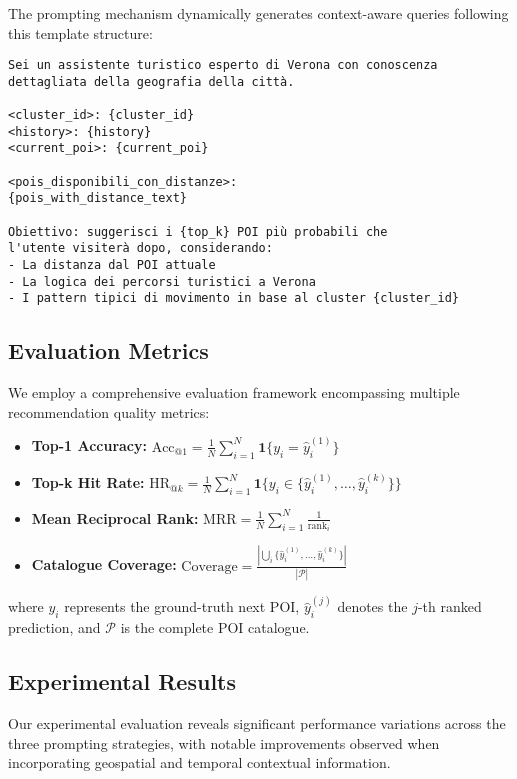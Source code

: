 \documentclass[12pt,a4paper]{article}
\begin{document}
The prompting mechanism dynamically generates context-aware queries following this template structure:

\begin{lstlisting}[language=text, caption=Comprehensive Context Prompt Template]
Sei un assistente turistico esperto di Verona con conoscenza 
dettagliata della geografia della città.

<cluster_id>: {cluster_id}
<history>: {history}
<current_poi>: {current_poi}

<pois_disponibili_con_distanze>:
{pois_with_distance_text}

Obiettivo: suggerisci i {top_k} POI più probabili che 
l'utente visiterà dopo, considerando:
- La distanza dal POI attuale
- La logica dei percorsi turistici a Verona
- I pattern tipici di movimento in base al cluster {cluster_id}
\end{lstlisting}

\subsection{Evaluation Metrics}

We employ a comprehensive evaluation framework encompassing multiple recommendation quality metrics:

\begin{itemize}
\item \textbf{Top-1 Accuracy:} $\text{Acc}_{@1} = \frac{1}{N}\sum_{i=1}^{N}\mathbf{1}\{y_i = \hat{y}_i^{(1)}\}$
\item \textbf{Top-k Hit Rate:} $\text{HR}_{@k} = \frac{1}{N}\sum_{i=1}^{N}\mathbf{1}\{y_i \in \{\hat{y}_i^{(1)}, \ldots, \hat{y}_i^{(k)}\}\}$
\item \textbf{Mean Reciprocal Rank:} $\text{MRR} = \frac{1}{N}\sum_{i=1}^{N}\frac{1}{\text{rank}_i}$
\item \textbf{Catalogue Coverage:} $\text{Coverage} = \frac{|\bigcup_{i}\{\hat{y}_i^{(1)}, \ldots, \hat{y}_i^{(k)}\}|}{|\mathcal{P}|}$
\end{itemize}

where $y_i$ represents the ground-truth next POI, $\hat{y}_i^{(j)}$ denotes the $j$-th ranked prediction, and $\mathcal{P}$ is the complete POI catalogue.

\subsection{Experimental Results}

Our experimental evaluation reveals significant performance variations across the three prompting strategies, with notable improvements observed when incorporating geospatial and temporal contextual information.
\end{document}
